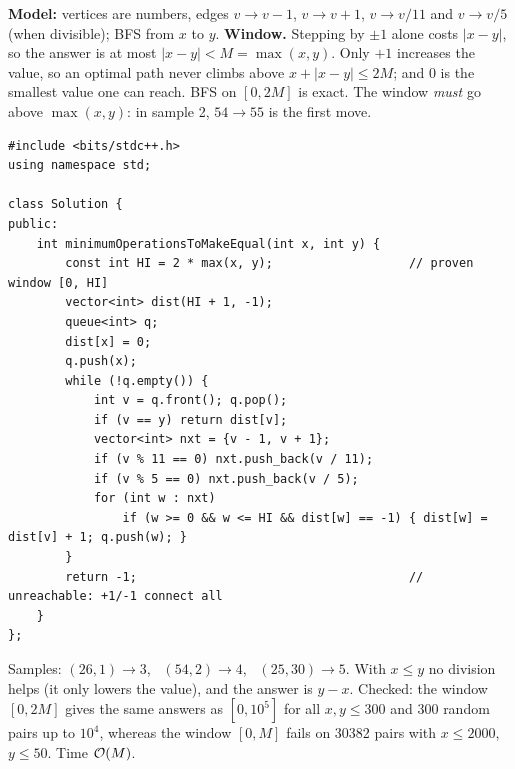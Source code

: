 \begin{solutionbox}
\textbf{Model:} vertices are numbers, edges $v \to v-1$, $v \to v+1$, $v \to v/11$ and $v \to v/5$ (when divisible); BFS from $x$ to $y$. \textbf{Window.} Stepping by $\pm1$ alone costs $|x - y|$, so the answer is at most $|x - y| < M = \max(x, y)$. Only $+1$ increases the value, so an optimal path never climbs above $x + |x - y| \le 2M$; and 0 is the smallest value one can reach. BFS on $[0, 2M]$ is exact. The window \emph{must} go above $\max(x,y)$: in sample 2, $54 \to 55$ is the first move.

\begin{center}
\end{center}
\begin{lstlisting}[style=cpp]
#include <bits/stdc++.h>
using namespace std;

class Solution {
public:
    int minimumOperationsToMakeEqual(int x, int y) {
        const int HI = 2 * max(x, y);                   // proven window [0, HI]
        vector<int> dist(HI + 1, -1);
        queue<int> q;
        dist[x] = 0;
        q.push(x);
        while (!q.empty()) {
            int v = q.front(); q.pop();
            if (v == y) return dist[v];
            vector<int> nxt = {v - 1, v + 1};
            if (v % 11 == 0) nxt.push_back(v / 11);
            if (v % 5 == 0) nxt.push_back(v / 5);
            for (int w : nxt)
                if (w >= 0 && w <= HI && dist[w] == -1) { dist[w] = dist[v] + 1; q.push(w); }
        }
        return -1;                                      // unreachable: +1/-1 connect all
    }
};
\end{lstlisting}
Samples: $(26, 1) \to 3$, \ $(54, 2) \to 4$, \ $(25, 30) \to 5$. With $x \le y$ no division helps (it only lowers the value), and the answer is $y - x$. Checked: the window $[0, 2M]$ gives the same answers as $[0, 10^5]$ for all $x, y \le 300$ and 300 random pairs up to $10^4$, whereas the window $[0, M]$ fails on 30382 pairs with $x \le 2000$, $y \le 50$. Time $\mathcal{O}(M)$.
\end{solutionbox}
